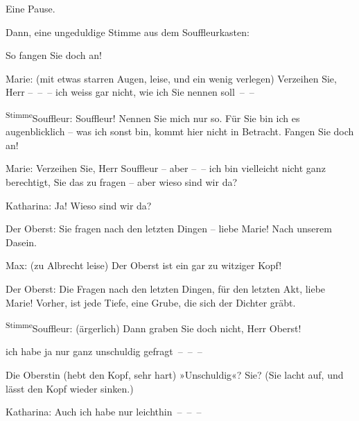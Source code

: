 \pstart
           Eine Pause.\pend
           
\pstart
           Dann, eine ungeduldige Stimme aus dem Souffleurkasten:\pend
           
\pstart
           {\pb}So fangen Sie doch an!\pend
           
\pstart
           Marie: (mit etwas starren Augen, leise, und ein wenig verlegen) Verzeihen Sie, Herr
               – – – ich weiss gar nicht, wie ich Sie nennen soll – –\pend
           
\pstart
           \substVorne{}\textsuperscript{Stimme}\substDazwischen{}Souffleur\substHinten{}: Souffleur! Nennen Sie mich nur so. Für Sie bin ich es augenblicklich – was
               ich sonst bin, kommt hier nicht in Betracht. Fangen Sie doch an!\pend
           
\pstart
           Marie: Verzeihen Sie, Herr Souffleur – aber – – ich bin vielleicht nicht ganz
               berechtigt, Sie das zu fragen – aber wieso sind wir da?\pend
           
\pstart
           Katharina: Ja! Wieso sind wir da?\pend
           
\pstart
           Der Oberst: Sie fragen nach den letzten Dingen – liebe Marie! Nach unserem
               Dasein.\pend
           
\pstart
           Max: (zu Albrecht leise) Der Oberst ist ein gar zu witziger Kopf!\pend
           
\pstart
           Der Oberst: Die  Fragen nach den letzten Dingen,
               für den letzten Akt, liebe Marie! Vorher, ist jede Tiefe, eine Grube, die sich der
               Dichter gräbt.\pend
           
\pstart
           \substVorne{}\textsuperscript{Stimme}\substDazwischen{}Souffleur\substHinten{}: (ärgerlich) Dann graben Sie doch nicht, Herr Oberst!\pend
           
\pstart
           \label{T_L01900-1v}\label{T_L01900-1} ich habe ja
               nur ganz unschuldig gefragt – – –\pend
           
\pstart
           Die Oberstin (hebt den Kopf, sehr hart) \introOben{}»\introOben{}Unschuldig\introOben{}«\introOben{}? Sie? (Sie lacht auf, und lässt den Kopf wieder
               sinken.)\pend
           
\pstart
           Katharina: Auch ich habe nur leichthin – – –\pend
           

